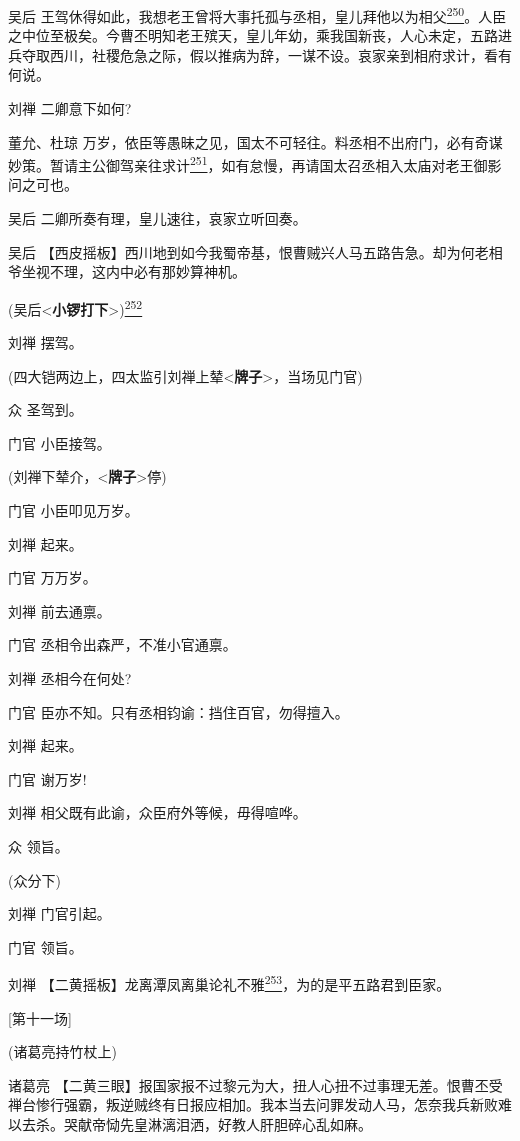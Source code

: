 吴后
王驾休得如此，我想老王曾将大事托孤与丞相，皇儿拜他以为相父\protect\hyperlink{fn250}{\textsuperscript{250}}。人臣之中位至极矣。今曹丕明知老王殡天，皇儿年幼，乘我国新丧，人心未定，五路进兵夺取西川，社稷危急之际，假以推病为辞，一谋不设。哀家亲到相府求计，看有何说。

刘禅 二卿意下如何?

董允、杜琼
万岁，依臣等愚昧之见，国太不可轻往。料丞相不出府门，必有奇谋妙策。暂请主公御驾亲往求计\protect\hyperlink{fn251}{\textsuperscript{251}}，如有怠慢，再请国太召丞相入太庙对老王御影问之可也。

吴后 二卿所奏有理，皇儿速往，哀家立听回奏。

吴后
【西皮摇板】西川地到如今我蜀帝基，恨曹贼兴人马五路告急。却为何老相爷坐视不理，这内中必有那妙算神机。

(吴后\textless{}\textbf{小锣打下}\textgreater{})\protect\hyperlink{fn252}{\textsuperscript{252}}

刘禅 摆驾。

(四大铠两边上，四太监引刘禅上辇\textless{}\textbf{牌子}\textgreater{}，当场见门官)

众 圣驾到。

门官 小臣接驾。

(刘禅下辇介，\textless{}\textbf{牌子}\textgreater{}停)

门官 小臣叩见万岁。

刘禅 起来。

门官 万万岁。

刘禅 前去通禀。

门官 丞相令出森严，不准小官通禀。

刘禅 丞相今在何处?

门官 臣亦不知。只有丞相钧谕：挡住百官，勿得擅入。

刘禅 起来。

门官 谢万岁!

刘禅 相父既有此谕，众臣府外等候，毋得喧哗。

众 领旨。

(众分下)

刘禅 门官引起。

门官 领旨。

刘禅
【二黄摇板】龙离潭凤离巢论礼不雅\protect\hyperlink{fn253}{\textsuperscript{253}}，为的是平五路君到臣家。

{[}第十一场{]}

(诸葛亮持竹杖上)

诸葛亮
【二黄三眼】报国家报不过黎元为大，扭人心扭不过事理无差。恨曹丕受禅台惨行强霸，叛逆贼终有日报应相加。我本当去问罪发动人马，怎奈我兵新败难以去杀。哭献帝恸先皇淋漓泪洒，好教人肝胆碎心乱如麻。

